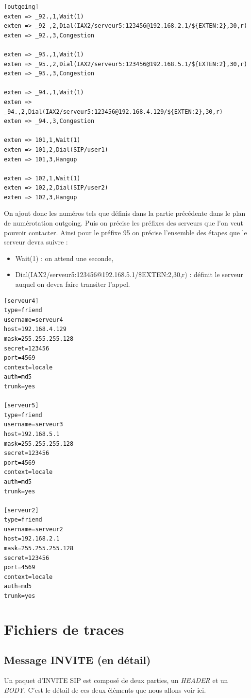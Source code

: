 \documentclass[12pt,a4paper,notitlepage]{article}
\begin{document}
\clearpage

\begin{lstlisting}[title=Ajout au fichier extension.conf pour IAX]
[outgoing]
exten => _92.,1,Wait(1)
exten => _92 ,2,Dial(IAX2/serveur5:123456@192.168.2.1/${EXTEN:2},30,r)
exten => _92.,3,Congestion

exten => _95.,1,Wait(1)
exten => _95.,2,Dial(IAX2/serveur5:123456@192.168.5.1/${EXTEN:2},30,r)
exten => _95.,3,Congestion

exten => _94.,1,Wait(1)
exten => _94.,2,Dial(IAX2/serveur5:123456@192.168.4.129/${EXTEN:2},30,r)
exten => _94.,3,Congestion

exten => 101,1,Wait(1)
exten => 101,2,Dial(SIP/user1)
exten => 101,3,Hangup

exten => 102,1,Wait(1)
exten => 102,2,Dial(SIP/user2)
exten => 102,3,Hangup
\end{lstlisting}

On ajout donc les numéros tels que définis dans la partie précédente dans le plan de numérotation outgoing. Puis on précise les préfixes des serveurs que l'on veut pouvoir contacter. Ainsi pour le préfixe 95 on précise l'ensemble des étapes que le serveur devra suivre :
\begin{itemize}
\item Wait(1) : on attend une seconde,
\item Dial(IAX2/serveur5:123456@192.168.5.1/\${EXTEN:2},30,r) : définit le serveur auquel on devra faire transiter l'appel.
\end{itemize}


\begin{lstlisting}[title=Fichier IAX.conf]
[serveur4]
type=friend
username=serveur4
host=192.168.4.129
mask=255.255.255.128
secret=123456
port=4569
context=locale
auth=md5
trunk=yes

[serveur5]
type=friend
username=serveur3
host=192.168.5.1
mask=255.255.255.128
secret=123456
port=4569
context=locale
auth=md5
trunk=yes

[serveur2]
type=friend
username=serveur2
host=192.168.2.1
mask=255.255.255.128
secret=123456
port=4569
context=locale
auth=md5
trunk=yes
\end{lstlisting}


\section{Fichiers de traces}
\subsection{Message INVITE (en détail)}
Un paquet d'INVITE SIP est composé de deux parties, un \textit{HEADER} et un  \textit{BODY}. C'est le détail de ces deux éléments que nous allons voir ici. 
\end{document}
